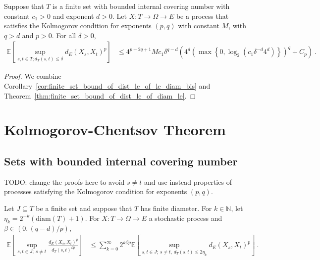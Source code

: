 \begin{corollary}\label{cor:finite_set_bound_of_dist_le}
  \leanok
Suppose that $T$ is a finite set with bounded internal covering number with constant $c_1>0$ and exponent $d > 0$.
Let $X : T \to \Omega \to E$ be a process that satisfies the Kolmogorov condition for exponents $(p,q)$ with constant $M$, with $q > d$ and $p > 0$.
For all $\delta > 0$,
\begin{align*}
  \mathbb{E}\left[ \sup_{s, t \in T; d_T(s, t) \le \delta} d_E(X_s, X_t)^p \right]
  &\le 4^{p+2q+1} M c_1 \delta^{q-d} \left(4^d \left(\max\left\{0, \log_2 \left(c_1 \delta^{-d} 4^d\right) \right\} \right)^q
    + C_p\right)
  \: .
\end{align*}
\end{corollary}


\begin{proof}\leanok
We combine Corollary~\ref{cor:finite_set_bound_of_dist_le_of_le_diam_bis} and Theorem~\ref{thm:finite_set_bound_of_dist_le_of_diam_le}.
\end{proof}




\section{Kolmogorov-Chentsov Theorem}


\subsection{Sets with bounded internal covering number}

TODO: change the proofs here to avoid $s \ne t$ and use instead properties of processes satisfying the Kolmogorov condition for exponents $(p,q)$.

\begin{lemma}\label{lem:integral_div_dist_le_sum_integral_dist_le}
  \leanok
Let $J \subseteq T$ be a finite set and suppose that $T$ has finite diameter.
For $k \in \mathbb{N}$, let $\eta_k = 2^{-k}(\mathrm{diam}(T) + 1)$.
For $X : T \to \Omega \to E$ a stochastic process and $\beta \in(0, (q - d)/p)$,
\begin{align*}
  \mathbb{E}\left[ \sup_{s, t \in J;\: s \ne t} \frac{d_E(X_s, X_t)^p}{d_T(s, t)^{\beta p}} \right]
  &\le \sum_{k=0}^\infty 2^{k \beta p} \mathbb{E}\left[ \sup_{s, t \in J;\: s \ne t, \: d_T(s, t) \le 2 \eta_k} d_E(X_s, X_t)^p \right]
  \: .
\end{align*}
\end{lemma}

